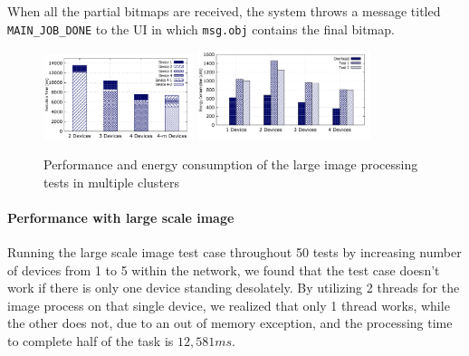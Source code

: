 \documentclass{sig-alternate}[10pt]
\begin{document}
\begin{figure}
\noindent {}
\end{figure}

When all the partial bitmaps are received, the system throws a message titled \texttt{MAIN\_JOB\_DONE} to the UI in which \texttt{msg.obj} contains the final bitmap.

\begin{figure}
	\centering
		\includegraphics[width=0.39\textwidth]{data/img_perf.pdf}
		\includegraphics[width=0.45\textwidth]{data/img_energy.pdf}
	\caption{Performance and energy consumption of the large image processing tests in multiple clusters}
	\label{fig:cluster_performance}
\end{figure}

\paragraph{Performance with large scale image}
Running the large scale image test case throughout 50 tests by increasing number of devices from 1 to 5 within the network, we found that the test case doesn't work if there is only one device standing desolately. By utilizing 2 threads for the image process on that single device, we realized that only 1 thread works, while the other does not, due to an out of memory exception, and the processing time to complete half of the task is $12,581ms$. 
\end{document}
